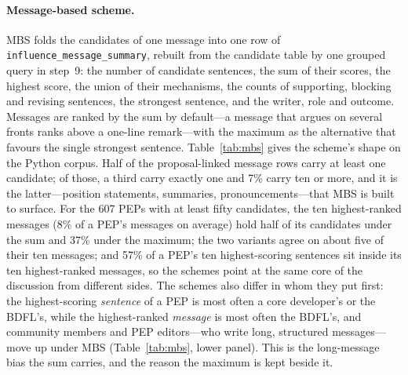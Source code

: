 \paragraph{Message-based scheme.} MBS folds the candidates of one message into one row of \texttt{influence\_message\_summary}, rebuilt from the candidate table by one grouped query in step~9: the number of candidate sentences, the sum of their scores, the highest score, the union of their mechanisms, the counts of supporting, blocking and revising sentences, the strongest sentence, and the writer, role and outcome. Messages are ranked by the sum by default---a message that argues on several fronts ranks above a one-line remark---with the maximum as the alternative that favours the single strongest sentence. Table~\ref{tab:mbs} gives the scheme's shape on the Python corpus. Half of the proposal-linked message rows carry at least one candidate; of those, a third carry exactly one and 7\% carry ten or more, and it is the latter---position statements, summaries, pronouncements---that MBS is built to surface. For the 607 PEPs with at least fifty candidates, the ten highest-ranked messages (8\% of a PEP's messages on average) hold half of its candidates under the sum and 37\% under the maximum; the two variants agree on about five of their ten messages; and 57\% of a PEP's ten highest-scoring sentences sit inside its ten highest-ranked messages, so the schemes point at the same core of the discussion from different sides. The schemes also differ in whom they put first: the highest-scoring \emph{sentence} of a PEP is most often a core developer's or the BDFL's, while the highest-ranked \emph{message} is most often the BDFL's, and community members and PEP editors---who write long, structured messages---move up under MBS (Table~\ref{tab:mbs}, lower panel). This is the long-message bias the sum carries, and the reason the maximum is kept beside it.

